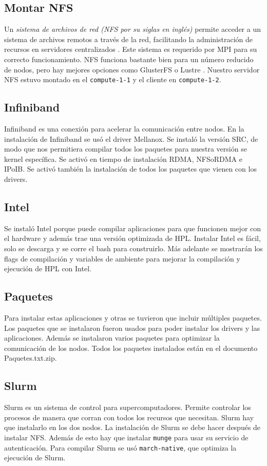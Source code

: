 \documentclass[conference,compsoc]{IEEEtran}
\begin{document}
\subsection{Montar NFS}
Un \textit{sistema de archivos de red (NFS por su siglas en inglés)} permite acceder a un sistema de archivos remotos a través de la red, facilitando la administración de recursos en servidores centralizados \cite{nfs-tutorial}. Este sistema es requerido por MPI para su correcto funcionamiento. NFS funciona bastante bien para un número reducido de nodos, pero hay mejores opciones como GlusterFS o Lustre \cite{Meta-Volante-0}. Nuestro servidor NFS estuvo montado en el \verb|compute-1-1| y el cliente en \verb|compute-1-2|.

\subsection{Infiniband}


Infiniband es una conexión para acelerar la comunicación entre nodos. En la instalación de Infiniband se usó el driver Mellanox. Se instaló la versión SRC, de modo que nos permitiera compilar todos los paquetes para nuestra versión se kernel específica. Se activó en tiempo de instalación RDMA, NFSoRDMA e IPoIB. Se activó también la instalación de todos los paquetes que vienen con los drivers.

\subsection{Intel}
 Se instaló Intel porque puede compilar aplicaciones para que funcionen mejor con el hardware y además trae una versión optimizada de HPL. Instalar Intel es fácil, solo se descarga y se corre el bash para construirlo. Más adelante se mostrarán los flags de compilación y variables de ambiente para mejorar la compilación y ejecución de HPL con Intel.\cite{intel-oneapi}

\subsection{Paquetes} 

Para instalar estas aplicaciones y otras se tuvieron que incluir múltiples paquetes. Los paquetes que se instalaron fueron usados para poder instalar los drivers y las aplicaciones. Además se instalaron varios paquetes para optimizar la comunicación de los nodos. Todos los paquetes instalados están en el documento Paquetes.txt.zip.
\subsection{Slurm}
Slurm es un sistema de control para supercomputadores. Permite controlar los procesos de manera que corran con todos los recursos que necesitan. Slurm hay que instalarlo en los dos nodos. La instalación de Slurm se debe hacer después de instalar NFS. Además de esto hay que instalar \verb|munge| para usar su servicio de autenticación. Para compilar Slurm se usó \verb|march-native|, que optimiza la ejecución de Slurm.
\end{document}

